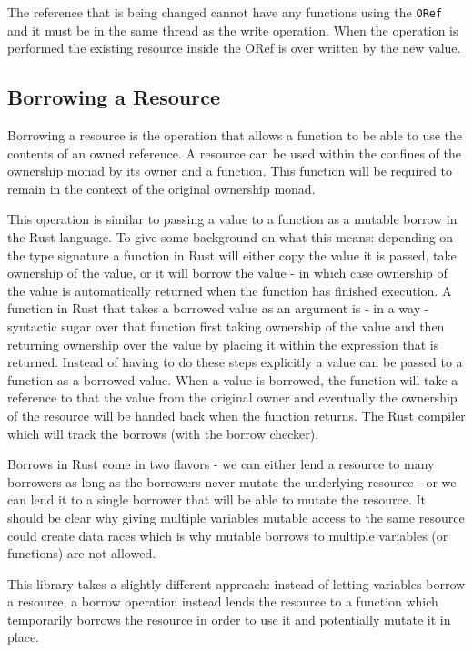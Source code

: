 \documentclass[onehalf,11pt]{beavtex}
\begin{document}
The reference that is being changed cannot have any functions using the
\texttt{ORef} and it must be in the same thread as the write operation.
When the operation is performed the existing resource inside the ORef is over
written by the new value.

\subsection{Borrowing a Resource}

Borrowing a resource is the operation that allows a function to be able to use
the contents of an owned reference.
A resource can be used within the confines of the ownership monad by its owner
and a function. This function will be required to remain in the
context of the original ownership monad.

This operation is similar to passing a value to a function as a mutable
borrow in the Rust language.
To give some background on what this means:
depending on the type signature a function in Rust will either copy the value
it is passed, take ownership of the value, or it will borrow the value - in
which case ownership of the value is automatically returned when the function
has finished execution.\cite{rust_book_ownership}
A function in Rust that takes a borrowed value as an argument is - in a way -
syntactic sugar over that function first taking ownership of the value and then
returning ownership over the value by placing it within the expression that is
returned.
Instead of having to do these steps explicitly a value can be passed to a
function as a borrowed value.  When a value is borrowed, the function will take
a reference to that the value from the original owner and eventually the
ownership of the resource will be handed back when the function returns.
The Rust compiler which will track the borrows (with the borrow checker).

Borrows in Rust come in two flavors - we can either lend a resource to many
borrowers as long as the borrowers never mutate the underlying resource - or we
can lend it to a single borrower that will be able to mutate the
resource.\cite{rust_book_borrowing}
It should be clear why giving multiple variables mutable access to
the same resource could create data races which is why mutable borrows to
multiple variables (or functions) are not allowed.

This library takes a slightly different approach: instead of letting variables
borrow a resource, a borrow operation instead lends the resource to a function
which temporarily borrows the resource in order to use it and potentially mutate
it in place.
\end{document}
